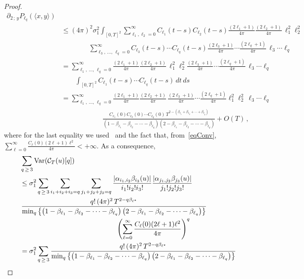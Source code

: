 \documentclass[AHL,Unicode,longabstracts,published]{cedram}
\newcommand{\clC}{\mathcal{C}}
\DeclareMathOperator{\Var}{Var}
\begin{document}
\begin{proof}
\begin{align*}
\partial_{2\,;\,y}P_{\ell_q}(\langle x,y \rangle) \\
& \leq(4\pi)^2\sigma _{1}^{2} \int_{[0,T]^2}
\sum_{\ell_1,\ell_2=0}^\infty C_{\ell_1}(t-s)C_{\ell_2}(t-s)\frac{(2\ell_1+1) }{4\pi}\frac{(2\ell_2+1)}{4\pi}\,\ell_1^2 \ell_2^2 \\
&\qquad\qquad \sum_{\ell_3,\,\dots,\,\ell_q=0}^\infty C_{\ell_3}(t-s)\cdots C_{\ell_q}(t-s)\frac{(2\ell_3+1)}{4\pi}\cdots\frac{(2\ell_q+1)}{4\pi}\,
\ell_3 \cdots \ell_q \\
& = \sum_{\ell_1,\,\dots,\,\ell_q=0}^\infty\frac{ (2\ell_1+1)}{4\pi}\frac{(2\ell_2+1)}{4\pi}\,\ell_1^2 \ell_2^2 \frac{ (2\ell_3+1)}{4\pi}\cdots\frac{(2\ell_q+1)}{4\pi}\, \ell_3 \cdots \ell_q
\\
&\qquad \int_{[0,T]^2} C_{\ell_1}(t-s)\cdots C_{\ell_q}(t-s)\,dt\,ds \\
&= \sum_{\ell_1,\,\dots,\,\ell_q=0}^\infty\frac{ (2\ell_1+1)}{4\pi}\frac{(2\ell_2+1)}{4\pi}\, \frac{(2\ell_3+1)}{4\pi}\cdots
\frac{(2\ell_q+1)}{4\pi} \ell_1^2 \ell_2^2 \, \ell_3 \cdots \ell_q
\\
&\qquad\qquad\qquad\frac{C_{\ell_1}(0)C_{\ell_2}(0)\cdots C_{\ell_q}(0)\,T^{2-\left(\beta_{\ell_1}+\beta_{\ell_2}+\cdots+\beta_{
\ell_q}\right)}}{\left(1-\beta_{\ell_1}-\beta_{\ell_2}-\cdots-\beta_{\ell_q}\right)\left(2-\beta_{
\ell_1}-\beta_{\ell_2}-\cdots-\beta_{\ell_q}\right)}+O(T)\,,
\end{align*}
\endgroup
where for the last equality we used~\cite[Lemma~4.11]{MRV:20} and the fact that, from~\eqref{eqConv}, $\sum_{\ell=0}^{\infty }\frac{C_{\ell }(0)(2\ell +1)\ell^2}{4\pi } <+\infty $. As a consequence,
\begingroup
\allowdisplaybreaks
\begin{align*}
&\sum_{q\,\geq\,3}\Var(\clC_{T}(u)[q])
\\
&\leq \sigma_{1}^{2}\sum_{q\,\geq\,3}\sum_{i_{1}+i_{2}+i_{3}=q}\sum_{j_{1}+j_{2}+j_{3}=q}\frac{\left|\alpha_{i_{1},i_{2}}\beta _{i_{3}}(u)\right|}{i_{1}!i_{2}!i_{3}!}\frac{\left|\alpha _{j_{1},j_{2}}\beta_{j_{3}}(u)\right|}{j_{1}!j_{2}!j_{3}!}
\\
&\,\frac{q!\,(4\pi)^{2}\,T^{2-q\beta_{\ell^{\star }}}}{
\min_{q}\left\{\left(1-\beta_{\ell_{1}}-\beta_{\ell_{2}}-\cdots -\beta_{\ell_{q}}\right)\left(2-\beta_{\ell _{1}}-\beta_{\ell_{2}}-\cdots -\beta_{\ell_{q}}\right)\right\}}
\\
& \mkern250mu\left(\sum_{\ell =0}^{\infty }\frac{C_\ell(0)(2\ell +1)\ell^{2}}{4\pi}\right)^{q}
\\
&=\sigma_{1}^{2}\sum_{q\,\geq\,3}\frac{q!\,(4\pi)^{2}\,T^{2-q\beta_{\ell^{\star }}}}{\min_{q}\left\{\left(1-\beta_{\ell _{1}}-\beta_{\ell _{2}}-\cdots -\beta_{\ell_{q}}\right)\left(2-\beta_{\ell_{1}}-\beta_{\ell _{2}}-\cdots -\beta_{\ell_{q}}\right)\right\}}

\end{align*}
\end{proof}
\end{document}
